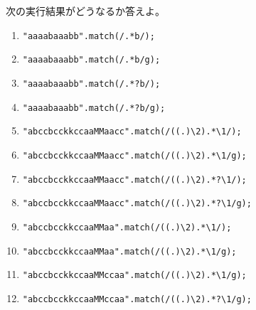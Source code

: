 \begin{Prob}\upshape
次の実行結果がどうなるか答えよ。
\begin{enumerate}
 \item \texttt{"aaaabaaabb".match(/.*b/);}
 \item \texttt{"aaaabaaabb".match(/.*b/g);}
 \item \texttt{"aaaabaaabb".match(/.*?b/);}
 \item \texttt{"aaaabaaabb".match(/.*?b/g);}
 \item \verb+"abccbcckkccaaMMaacc".match(/((.)\2).*\1/);+
 \item \verb+"abccbcckkccaaMMaacc".match(/((.)\2).*\1/g);+
 \item \verb+"abccbcckkccaaMMaacc".match(/((.)\2).*?\1/);+
 \item \verb+"abccbcckkccaaMMaacc".match(/((.)\2).*?\1/g);+
 \item \verb+"abccbcckkccaaMMaa".match(/((.)\2).*\1/);+
 \item \verb+"abccbcckkccaaMMaa".match(/((.)\2).*\1/g);+
 \item \verb+"abccbcckkccaaMMccaa".match(/((.)\2).*\1/g);+
 \item \verb+"abccbcckkccaaMMccaa".match(/((.)\2).*?\1/g);+
%
\end{enumerate}
\end{Prob}
\iffalse
"abccbcckkccaaMMaacc".match(/((.)\2).*\1/g);
["ccbcckkccaaMMaacc"]
"abccbcckkccaaMMaacc".match(/((.)\2).*?\1/g);
["ccbcc", "ccaaMMaacc"]
"abccbcckkccaaMMccaa".match(/((.)\2).*\1/g);
["ccbcckkccaaMMcc"]
"abccbcckkccaaMMccaa".match(/((.)\2).*?\1/g);
["ccbcc", "ccaaMMcc"]
\fi